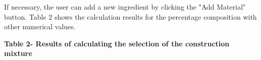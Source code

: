 {%

If necessary, the user can add a new ingredient by clicking the "Add
Material" button. Table 2 shows the calculation results for the
percentage composition with other numerical values.

{\bfseries Table 2- Results of calculating the selection of the
construction mixture}

}
